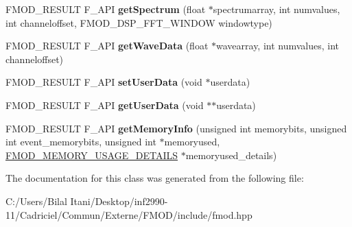 \begin{DoxyCompactItemize}
\item 
F\+M\+O\+D\+\_\+\+R\+E\+S\+U\+LT F\+\_\+\+A\+PI {\bfseries get\+Spectrum} (float $\ast$spectrumarray, int numvalues, int channeloffset, F\+M\+O\+D\+\_\+\+D\+S\+P\+\_\+\+F\+F\+T\+\_\+\+W\+I\+N\+D\+OW windowtype)\hypertarget{class_f_m_o_d_1_1_channel_group_a8ee0bad7f2c729641b5d61f2f2aff135}{}\label{class_f_m_o_d_1_1_channel_group_a8ee0bad7f2c729641b5d61f2f2aff135}

\item 
F\+M\+O\+D\+\_\+\+R\+E\+S\+U\+LT F\+\_\+\+A\+PI {\bfseries get\+Wave\+Data} (float $\ast$wavearray, int numvalues, int channeloffset)\hypertarget{class_f_m_o_d_1_1_channel_group_a8d632fabc33cc9f67e528c76489c9172}{}\label{class_f_m_o_d_1_1_channel_group_a8d632fabc33cc9f67e528c76489c9172}

\item 
F\+M\+O\+D\+\_\+\+R\+E\+S\+U\+LT F\+\_\+\+A\+PI {\bfseries set\+User\+Data} (void $\ast$userdata)\hypertarget{class_f_m_o_d_1_1_channel_group_a0a71472fd896173cae99c4d2c42743df}{}\label{class_f_m_o_d_1_1_channel_group_a0a71472fd896173cae99c4d2c42743df}

\item 
F\+M\+O\+D\+\_\+\+R\+E\+S\+U\+LT F\+\_\+\+A\+PI {\bfseries get\+User\+Data} (void $\ast$$\ast$userdata)\hypertarget{class_f_m_o_d_1_1_channel_group_a347e86f79b6679e20b4515846644e8a4}{}\label{class_f_m_o_d_1_1_channel_group_a347e86f79b6679e20b4515846644e8a4}

\item 
F\+M\+O\+D\+\_\+\+R\+E\+S\+U\+LT F\+\_\+\+A\+PI {\bfseries get\+Memory\+Info} (unsigned int memorybits, unsigned int event\+\_\+memorybits, unsigned int $\ast$memoryused, \hyperlink{struct_f_m_o_d___m_e_m_o_r_y___u_s_a_g_e___d_e_t_a_i_l_s}{F\+M\+O\+D\+\_\+\+M\+E\+M\+O\+R\+Y\+\_\+\+U\+S\+A\+G\+E\+\_\+\+D\+E\+T\+A\+I\+LS} $\ast$memoryused\+\_\+details)\hypertarget{class_f_m_o_d_1_1_channel_group_a8483ad1631034c7be3fdcf0a9633bbb7}{}\label{class_f_m_o_d_1_1_channel_group_a8483ad1631034c7be3fdcf0a9633bbb7}

\end{DoxyCompactItemize}


The documentation for this class was generated from the following file\+:\begin{DoxyCompactItemize}
\item 
C\+:/\+Users/\+Bilal Itani/\+Desktop/inf2990-\/11/\+Cadriciel/\+Commun/\+Externe/\+F\+M\+O\+D/include/fmod.\+hpp\end{DoxyCompactItemize}
